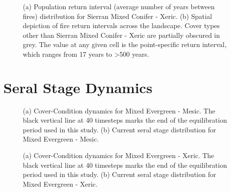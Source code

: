\begin{figure}[!htbp]
  \centering
  \caption{(a) Population return interval (average number of years between fires) distribution for Sierran Mixed Conifer - Xeric.  (b) Spatial depiction of fire return intervals across the landscape. Cover types other than Sierran Mixed Conifer - Xeric are partially obscured in grey. The value at any given cell is the point-specific return interval, which ranges from 17 years to \textgreater 500 years.}
\label{fig:preturn_smcx_app}
\end{figure}

\clearpage

\section{Seral Stage Dynamics}
\label{app:sec:seraldynamics}


\begin{figure}[!htbp]
  \centering
  \caption{(a) Cover-Condition dynamics for Mixed Evergreen - Mesic. The black vertical line at 40 timesteps marks the end of the equilibration period used in this study. (b) Current seral stage distribution for Mixed Evergreen - Mesic.}
\label{fig:covcond_megm}
\end{figure}

\begin{figure}[!htbp]
  \centering
  \caption{(a) Cover-Condition dynamics for Mixed Evergreen - Xeric. The black vertical line at 40 timesteps marks the end of the equilibration period used in this study. (b) Current seral stage distribution for Mixed Evergreen - Xeric.} 
  \label{fig:covcond_megx}
\end{figure}


